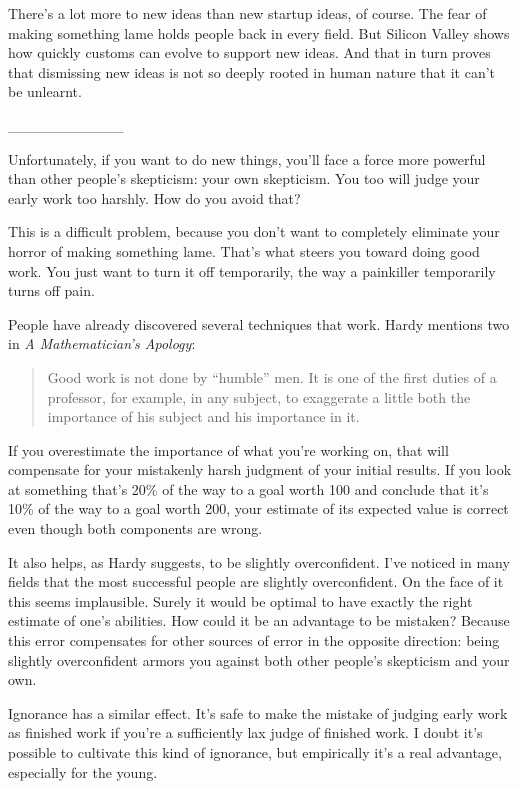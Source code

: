 There's a lot more to new ideas than new startup ideas, of course. The
fear of making something lame holds people back in every field. But
Silicon Valley shows how quickly customs can evolve to support new
ideas. And that in turn proves that dismissing new ideas is not so
deeply rooted in human nature that it can't be unlearnt.

\_\_\_\_\_\_\_\_\_\_\_

Unfortunately, if you want to do new things, you'll face a force more
powerful than other people's skepticism: your own skepticism. You too
will judge your early work too harshly. How do you avoid that?

This is a difficult problem, because you don't want to completely
eliminate your horror of making something lame. That's what steers you
toward doing good work. You just want to turn it off temporarily, the
way a painkiller temporarily turns off pain.

People have already discovered several techniques that work. Hardy
mentions two in \emph{A Mathematician's Apology}:

\begin{quote}
Good work is not done by ``humble'' men. It is one of the first duties
of a professor, for example, in any subject, to exaggerate a little both
the importance of his subject and his importance in it.
\end{quote}

If you overestimate the importance of what you're working on, that will
compensate for your mistakenly harsh judgment of your initial results.
If you look at something that's 20\% of the way to a goal worth 100 and
conclude that it's 10\% of the way to a goal worth 200, your estimate of
its expected value is correct even though both components are wrong.

It also helps, as Hardy suggests, to be slightly overconfident. I've
noticed in many fields that the most successful people are slightly
overconfident. On the face of it this seems implausible. Surely it would
be optimal to have exactly the right estimate of one's abilities. How
could it be an advantage to be mistaken? Because this error compensates
for other sources of error in the opposite direction: being slightly
overconfident armors you against both other people's skepticism and your
own.

Ignorance has a similar effect. It's safe to make the mistake of judging
early work as finished work if you're a sufficiently lax judge of
finished work. I doubt it's possible to cultivate this kind of
ignorance, but empirically it's a real advantage, especially for the
young.

